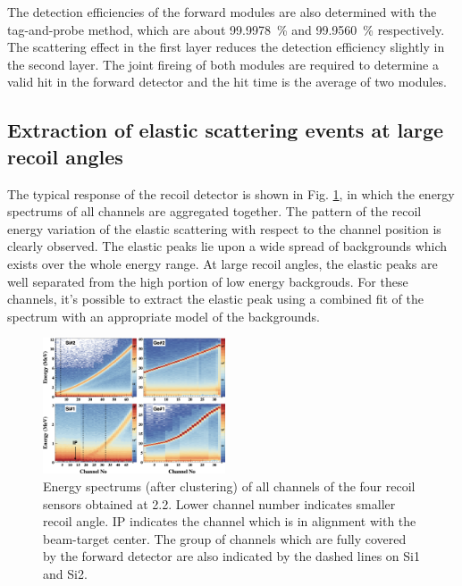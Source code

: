\documentclass[number,5p]{elsarticle}
\begin{document}
The detection efficiencies of the forward modules are also determined with the
tag-and-probe method, which are about \SI{99.9978}{\percent} and \SI{99.9560}{\percent} respectively.
The scattering effect in the first layer reduces the detection efficiency slightly in the second layer.
The joint fireing of both modules are required to determine a valid hit in the
forward detector and the hit time is the average of two modules.

\subsection{Extraction of elastic scattering events at large recoil angles}
\label{sec:recoil_performance}
The typical response of the recoil detector is shown in Fig. \ref{fig:e_map}, in which the energy spectrums of all channels are aggregated together.
The pattern of the recoil energy variation of the elastic scattering with
respect to the channel position is clearly observed.
The elastic peaks lie upon a wide spread of backgrounds which exists over the whole energy range.
At large recoil angles, the elastic peaks are well separated from the high portion of low energy backgrouds.
For these channels, it's possible to extract the elastic peak using a combined fit of the spectrum with an appropriate model of the backgrounds.
\begin{figure}[htb!]
  \centering
  \includegraphics[width=0.48\textwidth]{./e_map.png}
  \caption{Energy spectrums (after clustering) of all channels of the four recoil
    sensors obtained at \SI{2.2}{\momentum}.
    Lower channel number indicates smaller recoil angle.
    IP indicates the channel which is in alignment with
    the beam-target center.
    The group of channels which are fully covered by the forward detector are
    also indicated by the dashed lines on Si1 and Si2.
  }
  \label{fig:e_map}
\end{figure}
\end{document}
